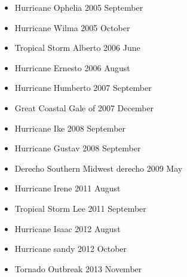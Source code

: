 \documentclass[12pt]{article}
\begin{document}
\begin{multicols}{2}
\begin{itemize}
\item Hurricane Ophelia 2005 September
\item Hurricane Wilma 2005 October
\item Tropical Storm Alberto 2006 June
\item Hurricane Ernesto 2006 August
\item Hurricane Humberto 2007 September
\item Great Coastal Gale of 2007 December
\item Hurricane Ike 2008 September
\item Hurricane Gustav 2008 September
\item Derecho Southern Midwest derecho 2009 May
\item Hurricane Irene 2011 August
\item Tropical Storm Lee 2011 September
\item Hurricane Isaac 2012 August
\item Hurricane sandy 2012 October
\item Tornado Outbreak 2013 November
\end{itemize}
\end{multicols}
\end{document}
